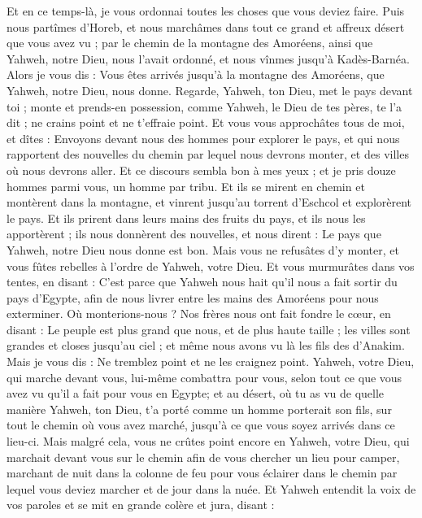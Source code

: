 \begin{multicols}{2}
Et en ce temps-là, je vous ordonnai toutes les choses que vous deviez faire.
Puis nous partîmes d'Horeb, et nous marchâmes dans tout ce grand et affreux désert que vous avez vu ; par le chemin de la montagne des Amoréens, ainsi que Yahweh, notre Dieu, nous l'avait ordonné, et nous vînmes jusqu'à Kadès-Barnéa.
Alors je vous dis : Vous êtes arrivés jusqu'à la montagne des Amoréens, que Yahweh, notre Dieu, nous donne.
Regarde, Yahweh, ton Dieu, met le pays devant toi ; monte et prends-en possession, comme Yahweh, le Dieu de tes pères, te l'a dit ; ne crains point et ne t'effraie point.
Et vous vous approchâtes tous de moi, et dîtes : Envoyons devant nous des hommes pour explorer le pays, et qui nous rapportent des nouvelles du chemin par lequel nous devrons monter, et des villes où nous devrons aller.
Et ce discours sembla bon à mes yeux ; et je pris douze hommes parmi vous, un homme par tribu.
Et ils se mirent en chemin et montèrent dans la montagne, et vinrent jusqu'au torrent d'Eschcol et explorèrent le pays.
Et ils prirent dans leurs mains des fruits du pays, et ils nous les apportèrent ; ils nous donnèrent des nouvelles, et nous dirent : Le pays que Yahweh, notre Dieu nous donne est bon. 
Mais vous ne refusâtes d'y monter, et vous fûtes rebelles à l'ordre de Yahweh, votre Dieu.
Et vous murmurâtes dans vos tentes, en disant : C'est parce que Yahweh nous hait qu'il nous a fait sortir du pays d'Egypte, afin de nous livrer entre les mains des Amoréens pour nous exterminer.
Où monterions-nous ? Nos frères nous ont fait fondre le cœur, en disant : Le peuple est plus grand que nous, et de plus haute taille ; les villes sont grandes et closes jusqu'au ciel ; et même nous avons vu là les fils des d'Anakim.
Mais je vous dis : Ne tremblez point et ne les craignez point.
Yahweh, votre Dieu, qui marche devant vous, lui-même combattra pour vous, selon tout ce que vous avez vu qu'il a fait pour vous en Egypte;
et au désert, où tu as vu de quelle manière  Yahweh, ton Dieu, t'a porté comme un homme porterait son fils, sur tout le chemin où vous avez marché, jusqu'à ce que vous soyez arrivés dans ce lieu-ci.
Mais malgré cela, vous ne crûtes point encore en Yahweh, votre Dieu,
qui marchait devant vous sur le chemin afin de vous chercher un lieu pour camper, marchant de nuit dans la colonne de feu pour vous éclairer dans le chemin par lequel vous deviez marcher et de jour dans la nuée.
Et Yahweh entendit la voix de vos paroles et se mit en grande colère et jura, disant :

\end{multicols}
